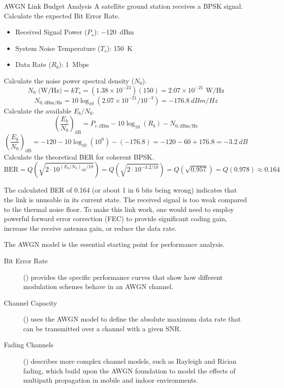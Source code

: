 \begin{workedexample}{AWGN Link Budget Analysis}
     A satellite ground station receives a BPSK signal. Calculate the expected Bit Error Rate.
    \begin{itemize}
        \item Received Signal Power ($P_s$): \qty{-120}{dBm}
        \item System Noise Temperature ($T_s$): \qty{150}{K}
        \item Data Rate ($R_b$): \qty{1}{Mbps}
    \end{itemize}
    \begin{derivationsteps}
        \step Calculate the noise power spectral density ($N_0$).
        \[ N_0 \text{ (W/Hz)} = kT_s = (1.38 \times 10^{-23})(150) = 2.07 \times 10^{-21} \text{ W/Hz} \]
        \[ N_{0, \text{dBm/Hz}} = 10\log_{10}(2.07 \times 10^{-21} / 10^{-3}) = \qty{-176.8}{dBm/Hz} \]
        \step Calculate the available $E_b/N_0$.
        \[ \left(\frac{E_b}{N_0}\right)_{\text{dB}} = P_{r, \text{dBm}} - 10\log_{10}(R_b) - N_{0, \text{dBm/Hz}} \]
        \[ \left(\frac{E_b}{N_0}\right)_{\text{dB}} = -120 - 10\log_{10}(10^6) - (-176.8) = -120 - 60 + 176.8 = \qty{-3.2}{dB} \]
        \step Calculate the theoretical BER for coherent BPSK.
        \[ \text{BER} = Q\left(\sqrt{2 \cdot 10^{(E_b/N_0)_{\text{dB}}/10}}\right) = Q\left(\sqrt{2 \cdot 10^{-3.2/10}}\right) = Q(\sqrt{0.957}) = Q(0.978) \approx 0.164 \]
    \end{derivationsteps}
     The calculated BER of 0.164 (or about 1 in 6 bits being wrong) indicates that the link is unusable in its current state. The received signal is too weak compared to the thermal noise floor. To make this link work, one would need to employ powerful forward error correction (FEC) to provide significant coding gain, increase the receive antenna gain, or reduce the data rate.
\end{workedexample}


\begin{importantbox}[title={Further Reading}]
    The AWGN model is the essential starting point for performance analysis.
    \begin{description}
        \item[Bit Error Rate] () provides the specific performance curves that show how different modulation schemes behave in an AWGN channel.
        \item[Channel Capacity] () uses the AWGN model to define the absolute maximum data rate that can be transmitted over a channel with a given SNR.
        \item[Fading Channels] () describes more complex channel models, such as Rayleigh and Rician fading, which build upon the AWGN foundation to model the effects of multipath propagation in mobile and indoor environments.
    \end{description}
\end{importantbox}
